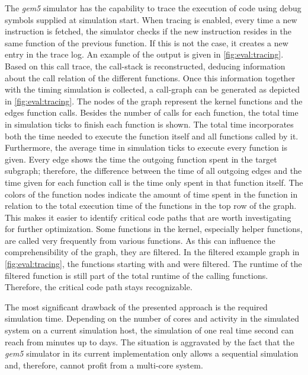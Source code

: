 The \emph{gem5} simulator has the capability to trace the execution of code using debug symbols supplied at simulation start. When tracing is enabled, every time a new instruction is fetched, the simulator checks if the new instruction resides in the same function of the previous function. If this is not the case, it creates a new entry in the trace log. An example of the output is given in \cref{fig:eval:tracing}. Based on this call trace, the call-stack is reconstructed, deducing information about the call relation of the different functions. Once this information together with the timing simulation is collected, a call-graph can be generated as depicted in \cref{fig:eval:tracing}. The nodes of the graph represent the kernel functions and the edges function calls. Besides the number of calls for each function, the total time in simulation ticks to finish each function is shown. The total time incorporates both the time needed to execute the function itself and all functions called by it. Furthermore, the average time in simulation ticks to execute every function is given. Every edge shows the time the outgoing function spent in the target subgraph; therefore, the difference between the time of all outgoing edges and the time given for each function call is the time only spent in that function itself. The colors of the function nodes indicate the amount of time spent in the function in relation to the total execution time of the functions in the top row of the graph. This makes it easier to identify critical code paths that are worth investigating for further optimization. Some functions in the kernel, especially helper functions, are called very frequently from various functions. As this can influence the comprehensibility of the graph, they are filtered. In the filtered example graph in \cref{fig:eval:tracing}, the functions starting with  and  were filtered. The runtime of the filtered function is still part of the total runtime of the calling functions. Therefore, the critical code path stays recognizable.

The most significant drawback of the presented approach is the required simulation time. Depending on the number of cores and activity in the simulated system on a current simulation host, the simulation of one real time second can reach from minutes up to days. The situation is aggravated by the fact that the \emph{gem5} simulator in its current implementation only allows a sequential simulation and, therefore, cannot profit from a multi-core system.


